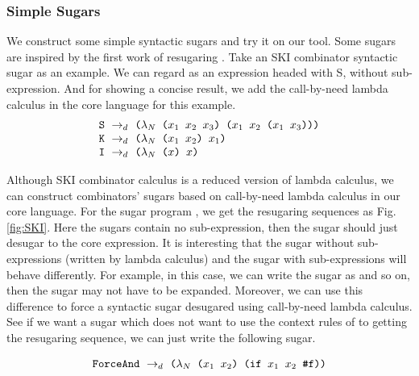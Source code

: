 \subsubsection{Simple Sugars}
\label{mark:simple}

We construct some simple syntactic sugars and try it on our tool. Some sugars are inspired by the first work of resugaring \cite{resugaring}. 
Take an SKI combinator syntactic sugar as an example. We can regard  as an expression headed with S, without sub-expression. And for showing a concise result, we add the call-by-need lambda calculus in the core language for this example.
\[
\begin{array}{l}
\mbox{\tt S} ~\rightarrow_d~ \texttt{($\lambda_N$ ($x_1$ $x_2$ $x_3$) ($x_1$ $x_2$ ($x_1$ $x_3$)))}\\
\mbox{\tt K} ~\rightarrow_d~ \texttt{($\lambda_N$ ($x_1$ $x_2$) $x_1$)}\\
\mbox{\tt I} ~\rightarrow_d~ \texttt{($\lambda_N$ ($x$) $x$)}
\end{array}
\]




Although SKI combinator calculus is a reduced version of lambda calculus, we can construct combinators' sugars based on call-by-need lambda calculus in our core language. For the sugar program , we get the resugaring sequences as Fig.  \ref{fig:SKI}. Here the sugars contain no sub-expression, then the sugar should just desugar to the core expression. It is interesting that the sugar without sub-expressions (written by lambda calculus) and the sugar with sub-expressions will behave differently. For example, in this case, we can write the sugar as  and so on, then the sugar may not have to be expanded. Moreover, we can use this difference to force a syntactic sugar desugared using call-by-need lambda calculus. See if we want a sugar  which does not
want to use the context rules of  to getting the resugaring sequence, we can just write the following sugar.

\[
\texttt{ForceAnd} ~\rightarrow_d~ \texttt{($\lambda_N$ ($x_1$ $x_2$) (if $x_1$ $x_2$ \#f))}
\]






